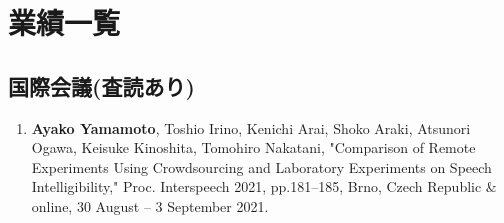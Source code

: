 \documentclass[11pt]{jreport}
\begin{document}


% 




\appendix
% 
% 
% 
% 
% 

\newpage
\section*{業績一覧}
\subsection*{国際会議(査読あり)}
 \begin{enumerate}

    \item \textbf{Ayako Yamamoto}, Toshio Irino, Kenichi Arai, Shoko Araki, Atsunori Ogawa, Keisuke Kinoshita, Tomohiro Nakatani, "Comparison of Remote Experiments Using Crowdsourcing and Laboratory Experiments on Speech Intelligibility," Proc. Interspeech 2021, pp.181--185, Brno, Czech Republic \& online, 30 August -- 3 September 2021.


\end{enumerate}
\end{document}
